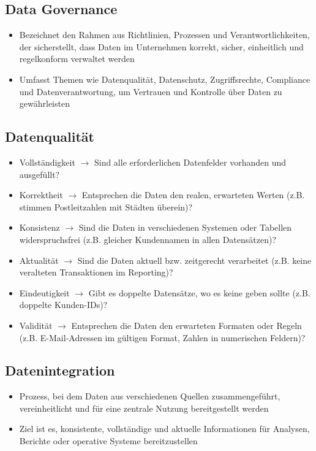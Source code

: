 \documentclass[11pt]{scrartcl}
\begin{document}
\subsection{Data Governance}
\begin{itemize}
\item Bezeichnet den Rahmen aus Richtlinien, Prozessen und Verantwortlichkeiten, der sicherstellt, dass Daten im Unternehmen korrekt, sicher, einheitlich und regelkonform verwaltet werden
\item Umfasst Themen wie Datenqualität, Datenschutz, Zugriffsrechte, Compliance und Datenverantwortung, um Vertrauen und Kontrolle über Daten zu gewährleisten
\end{itemize}


\subsection{Datenqualität}
\begin{itemize}
\item Vollständigkeit $ \to $ Sind alle erforderlichen Datenfelder vorhanden und ausgefüllt?
\item Korrektheit $ \to $ Entsprechen die Daten den realen, erwarteten Werten (z.B. stimmen Postleitzahlen mit Städten überein)?
\item Konsistenz $ \to $ Sind die Daten in verschiedenen Systemen oder Tabellen widerspruchsfrei (z.B. gleicher Kundennamen in allen Datensätzen)?
\item Aktualität $ \to $ Sind die Daten aktuell bzw. zeitgerecht verarbeitet (z.B. keine veralteten Transaktionen im Reporting)?
\item Eindeutigkeit $ \to $ Gibt es doppelte Datensätze, wo es keine geben sollte (z.B. doppelte Kunden-IDs)?
\item Validität $ \to $ Entsprechen die Daten den erwarteten Formaten oder Regeln (z.B. E-Mail-Adressen im gültigen Format, Zahlen in numerischen Feldern)?
\end{itemize}


\subsection{Datenintegration}
\begin{itemize}
	\item Prozess, bei dem Daten aus verschiedenen Quellen zusammengeführt, vereinheitlicht und für eine zentrale Nutzung bereitgestellt werden
	\item Ziel ist es, konsistente, vollständige und aktuelle Informationen für Analysen, Berichte oder operative Systeme bereitzustellen
\end{itemize}
\end{document}
